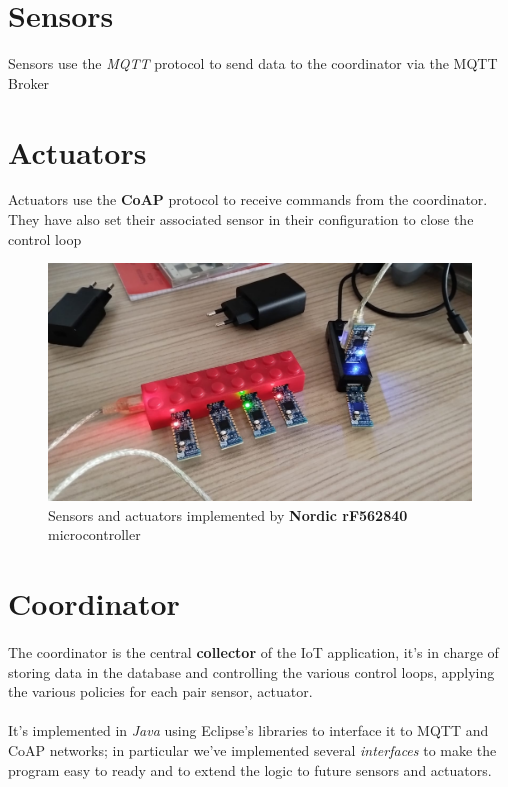 \documentclass[parskip=full]{report}
\begin{document}
\section{Sensors}

Sensors use the \textit{MQTT} protocol to send data to the coordinator via the MQTT Broker

\section{Actuators}
Actuators use the \textbf{CoAP} protocol to receive commands from the coordinator. They have also set their associated sensor in their configuration to close the control loop
\begin{figure}[H]
	\centering
	\includegraphics[width=0.7\linewidth]{assets/sensors}
	\caption{Sensors and actuators implemented by \textbf{Nordic rF562840} microcontroller }
	\label{fig:sensors}
\end{figure}

\section{Coordinator}

\paragraph{}
The coordinator is the central \textbf{collector} of the IoT application, it's in charge of storing data in the database and controlling the various control loops, applying the various policies for each pair sensor, actuator.

\paragraph{}
It's implemented in \textit{Java} using Eclipse's libraries to interface it to MQTT and CoAP networks; in particular we've implemented several \textit{interfaces} to make the program easy to ready and to extend the logic to future sensors and actuators.
\end{document}
